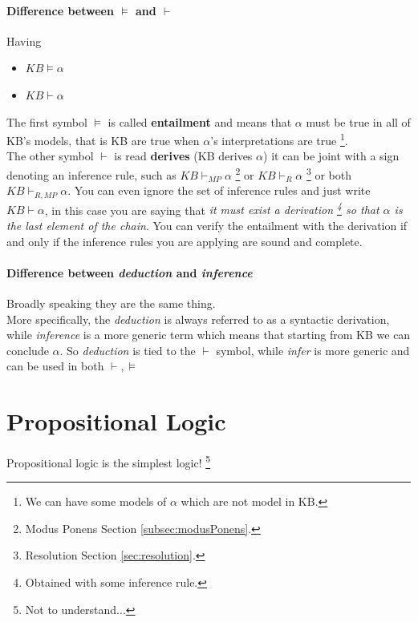 \documentclass[10pt,a4paper]{article}
\begin{document}
\paragraph{Difference between $\models$ and $\vdash$}
Having 
\begin{itemize}
\item $KB\models \alpha$
\item $KB \vdash \alpha$
\end{itemize}
The first symbol $\models$  is called \textbf{entailment} and means that $\alpha$ must be true in all of KB's models, that is KB  are true when $\alpha$'s interpretations are true \footnote{We can have some models of $\alpha$ which are not model in KB.}.\\
The other symbol $\vdash$ is read \textbf{derives} (KB derives $\alpha$) it can be joint with a sign denoting an inference rule, such as $KB \vdash_{MP}\alpha$ \footnote{Modus Ponens Section \ref{subsec:modusPonens}.} or $KB \vdash_{R}\alpha$ \footnote{Resolution Section \ref{sec:resolution}.} or both $KB \vdash_{R,MP}\alpha$. You can even ignore the set of inference rules and just write $KB \vdash\alpha$, in this case you are saying that \textit{it must exist a derivation \footnote{Obtained with some inference rule.} so that $\alpha$ is the last element of the chain}. You can verify the entailment with the derivation if and only if the inference rules you are applying are sound and complete.


\paragraph{Difference between \textit{deduction} and \textit{inference}}
Broadly speaking they are the same thing.\\
More specifically, the \textit{deduction} is always referred to as a syntactic derivation, while \textit{inference} is a more generic  term which means that starting from KB we can conclude $\alpha$. So \textit{deduction} is tied to the $\vdash$ symbol, while \textit{infer} is more generic and can be used in both $\vdash, \models$

\newpage
\section{Propositional Logic}
Propositional logic is the simplest logic! \footnote{Not to understand...}
\end{document}

